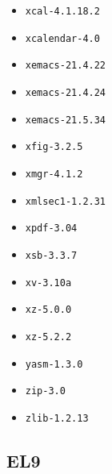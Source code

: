 \begin{multicols}{3}
\begin{itemize}
\item \verb|xcal-4.1.18.2|
\item \verb|xcalendar-4.0|
\item \verb|xemacs-21.4.22|
\item \verb|xemacs-21.4.24|
\item \verb|xemacs-21.5.34|
\item \verb|xfig-3.2.5|
\item \verb|xmgr-4.1.2|
\item \verb|xmlsec1-1.2.31|
\item \verb|xpdf-3.04|
\item \verb|xsb-3.3.7|
\item \verb|xv-3.10a|
\item \verb|xz-5.0.0|
\item \verb|xz-5.2.2|
\item \verb|yasm-1.3.0|
\item \verb|zip-3.0|
\item \verb|zlib-1.2.13|
\end{itemize}
\end{multicols}
\normalsize

\subsection{EL9}
\label{sect:software-el9}

